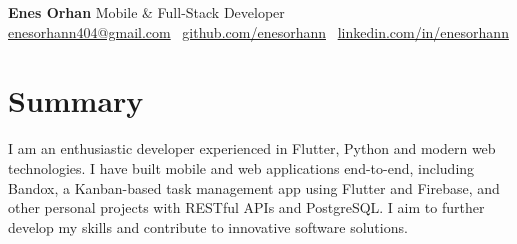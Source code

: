 \documentclass[10pt,a4paper]{extarticle}
\begin{document}
\begin{center}
    \begin{minipage}{\textwidth}
        \centering
        {\LARGE\textbf{Enes Orhan}} \hspace{2pt} {\LARGE{Mobile \& Full-Stack Developer}}\\[10pt]
        \href{mailto:enesorhann404@gmail.com}{enesorhann404@gmail.com} \textbullet\
        \href{https://github.com/enesorhann}{github.com/enesorhann} \textbullet\
        \href{https://linkedin.com/in/enesorhann}{linkedin.com/in/enesorhann}
    \end{minipage}
\end{center}
\section{Summary}
I am an enthusiastic developer experienced in Flutter, Python and modern web technologies. I have built mobile and web applications end-to-end, including Bandox, a Kanban-based task management app using Flutter and Firebase, and other personal projects with RESTful APIs and PostgreSQL. I aim to further develop my skills and contribute to innovative software solutions.
\end{document}
